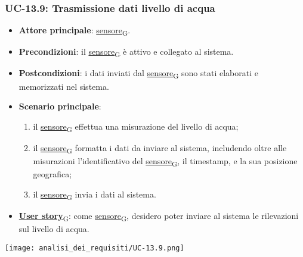 \newpage

\subsubsection{UC-13.9: Trasmissione dati livello di acqua}
\begin{itemize}
	\item \textbf{Attore principale}: \href{https://7last.github.io/docs/rtb/documentazione-interna/glossario\#sensore}{sensore\textsubscript{G}}.
	\item \textbf{Precondizioni}: il \href{https://7last.github.io/docs/rtb/documentazione-interna/glossario\#sensore}{sensore\textsubscript{G}} è attivo e collegato al sistema.
	\item \textbf{Postcondizioni}: i dati inviati dal \href{https://7last.github.io/docs/rtb/documentazione-interna/glossario\#sensore}{sensore\textsubscript{G}} sono stati elaborati e memorizzati nel sistema.
	\item \textbf{Scenario principale}:
	      \begin{enumerate}
		      \item il \href{https://7last.github.io/docs/rtb/documentazione-interna/glossario\#sensore}{sensore\textsubscript{G}} effettua una misurazione del livello di acqua;
		      \item il \href{https://7last.github.io/docs/rtb/documentazione-interna/glossario\#sensore}{sensore\textsubscript{G}} formatta i dati da inviare al sistema, includendo oltre alle misurazioni l'identificativo del \href{https://7last.github.io/docs/rtb/documentazione-interna/glossario\#sensore}{sensore\textsubscript{G}},
		            il timestamp, e la sua posizione geografica;
		      \item il \href{https://7last.github.io/docs/rtb/documentazione-interna/glossario\#sensore}{sensore\textsubscript{G}} invia i dati al sistema.
	      \end{enumerate}
	\item \href{https://7last.github.io/docs/rtb/documentazione-interna/glossario\#user-story}{\textbf{User story}\textsubscript{G}}: come \href{https://7last.github.io/docs/rtb/documentazione-interna/glossario\#sensore}{sensore\textsubscript{G}}, desidero poter inviare al sistema le rilevazioni sul livello di acqua.
\end{itemize}

\begin{center}
	\texttt{[image: analisi\_dei\_requisiti/UC-13.9.png]}
\end{center}

